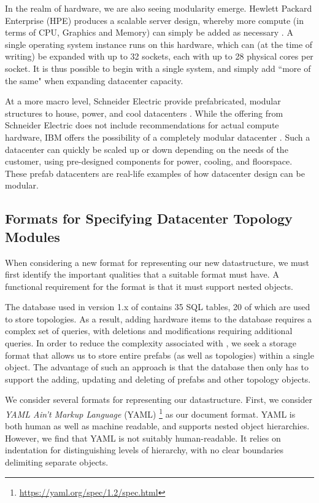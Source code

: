 \documentclass[11pt]{article}
\begin{document}
		In the realm of hardware, we are also seeing modularity emerge. 
		Hewlett Packard Enterprise (HPE) produces a scalable server design, whereby more compute (in terms of CPU, Graphics and Memory) can simply be added as necessary \cite{Bang2020}.
		A single operating system instance runs on this hardware, which can (at the time of writing) be expanded with up to 32 sockets, each with up to 28 physical cores per socket.
		It is thus possible to begin with a single system, and simply add ``more of the same" when expanding datacenter capacity.

		At a more macro level, Schneider Electric provide prefabricated, modular structures to house, power, and cool datacenters \cite{Torell2014, Torell2017}.
		While the offering from Schneider Electric does not include recommendations for actual compute hardware, IBM offers the possibility of a completely modular datacenter \cite{IBM2014}.
		Such a datacenter can quickly be scaled up or down depending on the needs of the customer, using pre-designed components for power, cooling, and floorspace. 
		These prefab datacenters are real-life examples of how datacenter design can be modular.

	
	\subsection{Formats for Specifying Datacenter Topology Modules}
		When considering a new format for representing our new datastructure, we must first identify the important qualities that a suitable format must have. 
		A functional requirement for the format is that it must support nested objects. 

		The database used in version 1.x of \opendc{} contains 35 SQL tables, 20 of which are used to store topologies.
		As a result, adding hardware items to the database requires a complex set of queries, with deletions and modifications requiring additional queries.
		In order to reduce the complexity associated with \opendc{}, we seek a storage format that allows us to store entire prefabs (as well as topologies) within a single object.
		The advantage of such an approach is that the database then only has to support the adding, updating and deleting of prefabs and other topology objects.

		We consider several formats for representing our datastructure.
		First, we consider \textit{YAML Ain't Markup Language} (YAML) \footnote{\url{https://yaml.org/spec/1.2/spec.html}} as our document format.
		YAML is both human as well as machine readable, and supports nested object hierarchies.
		However, we find that YAML is not suitably human-readable.
		It relies on indentation for distinguishing levels of hierarchy, with no clear boundaries delimiting separate objects.
\end{document}
